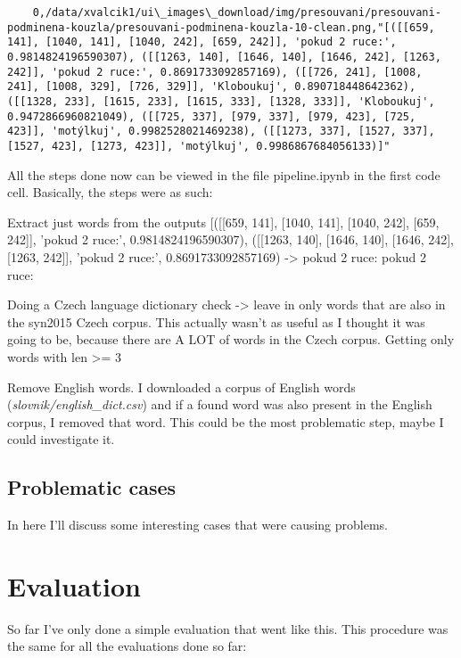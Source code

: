 \documentclass[
  digital,     %
  oneside,     %
  nosansbold,  %
  nocolorbold, %
  nolof,         %
  nolot,         %
]{fithesis4}
\begin{document}
\begin{verbatim}
    0,/data/xvalcik1/ui\_images\_download/img/presouvani/presouvani-podminena-kouzla/presouvani-podminena-kouzla-10-clean.png,"[([[659, 141], [1040, 141], [1040, 242], [659, 242]], 'pokud 2 ruce:', 0.9814824196590307), ([[1263, 140], [1646, 140], [1646, 242], [1263, 242]], 'pokud 2 ruce:', 0.8691733092857169), ([[726, 241], [1008, 241], [1008, 329], [726, 329]], 'Kloboukuj', 0.890718448642362), ([[1328, 233], [1615, 233], [1615, 333], [1328, 333]], 'Kloboukuj', 0.9472866960821049), ([[725, 337], [979, 337], [979, 423], [725, 423]], 'motýlkuj', 0.9982528021469238), ([[1273, 337], [1527, 337], [1527, 423], [1273, 423]], 'motýlkuj', 0.9986867684056133)]"
\end{verbatim}




All the steps done now can be viewed in the file pipeline.ipynb in the first code cell. Basically, the steps were as such:

Extract just words from the outputs [([[659, 141], [1040, 141], [1040, 242], [659, 242]], 'pokud 2 ruce:', 0.9814824196590307), ([[1263, 140], [1646, 140], [1646, 242], [1263, 242]], 'pokud 2 ruce:', 0.8691733092857169) -> pokud 2 ruce: pokud 2 ruce:

Doing a Czech language dictionary check -> leave in only words that are also in the syn2015 Czech corpus. This actually wasn't as useful as I thought it was going to be, because there are A LOT of words in the Czech corpus.
Getting only words with len >= 3

Remove English words. I downloaded a corpus of English words (\emph{slovnik/english\_dict.csv}) and if a found word was also present in the English corpus, I removed that word. This could be the most problematic step, maybe I could investigate it.

\section{Problematic cases}

In here I'll discuss some interesting cases that were causing problems.

\chapter{Evaluation}

So far I've only done a simple evaluation that went like this. This procedure was the same for all the evaluations done so far:
\end{document}

